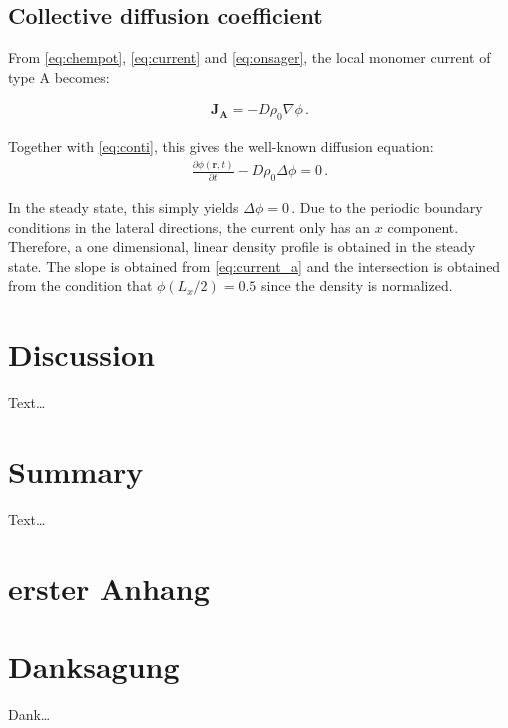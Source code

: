 \documentclass[bachelor,       %
               twoside,        %
               BCOR10mm,       %
                ngerman,english  %
               ]{GAUBM}
\begin{document}
\section{Collective diffusion coefficient}

From \eqref{eq:chempot}, \eqref{eq:current} and \eqref{eq:onsager}, the local monomer current of type A becomes:

\begin{align}
  \mathbf{J_A}=-D\rho_0\nabla\phi\,.
  \label{eq:current_a}
\end{align}

Together with \eqref{eq:conti}, this gives the well-known diffusion equation:
\begin{align}
  \frac{\partial\phi(\mathbf r, t)}{\partial t}-D\rho_0 \Delta \phi=0\,.
  \label{eq:diffusion}
\end{align}

In the steady state, this simply yields $\Delta\phi=0\,.$ Due to the periodic boundary conditions in the lateral directions, the current only has an $x$ component. Therefore, a one dimensional, linear density profile is obtained in the steady state. The slope is obtained from \eqref{eq:current_a} and the intersection is obtained from the condition that $\phi(L_x/2)=0.5$ since the density is normalized. 
\chapter{Discussion}
Text\dots
\chapter{Summary}
Text\dots

\appendix

\chapter{erster Anhang}


\cleardoublepage
 

\chapter*{Danksagung}
Dank\dots

\Declaration
\end{document}
